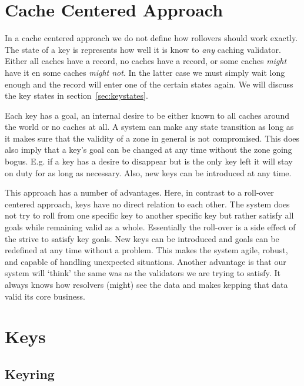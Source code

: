 \documentclass[twoside, a4paper]{article}
\begin{document}
\section{Cache Centered Approach}

In a cache centered approach we do not define how rollovers should 
work exactly. The state of a key is represents how well it is know 
to \emph{any} caching validator. Either all caches have a record, no 
caches have a record, or some caches \emph{might} have it en some 
caches \emph{might not}. In the latter case we must simply wait long 
enough and the record will enter one of the certain states again. We 
will discuss the key states in section~\ref{sec:keystates}.

Each key has a goal, an internal desire to be either known to all 
caches around the world or no caches at all. A system can make any 
state transition as long as it makes sure that the validity of a 
zone in general is not compromised. This does also imply that a 
key's goal can be changed at any time without the zone going bogus. 
E.g. if a key has a desire to disappear but is the only key left it 
will stay on duty for as long as necessary. Also, new keys can be 
introduced at any time.

This approach has a number of advantages. Here, in contrast to a 
roll-over centered approach, keys have no direct relation to each 
other. The system does not try to roll from one specific key to 
another specific key but rather satisfy all goals while remaining 
valid as a whole. Essentially the roll-over is a side effect of the 
strive to satisfy key goals. New keys can be introduced and goals 
can be redefined at any time without a problem. This makes the 
system agile, robust, and capable of handling unexpected situations. 
Another advantage is that our system will `think' the same was as 
the validators we are trying to satisfy. It always knows how 
resolvers (might) see the data and makes kepping that data valid its 
core business. 


\section{Keys}

\subsection{Keyring}
\end{document}
